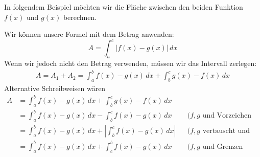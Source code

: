 \begin{bsp}
    In folgendem Beispiel möchten wir die Fläche zwischen den beiden Funktion $f(x)$ und $g(x)$ berechnen.
    \begin{center}
    \end{center}
    Wir können unsere Formel mit dem Betrag anwenden:
    \begin{equation*}
        A = \int_a^c \left| f(x)-g(x) \right| \, dx
    \end{equation*}
    Wenn wir jedoch nicht den Betrag verwenden, müssen wir das Intervall zerlegen:
    \begin{align*}
        A = A_1 + A_2 = \int_a^b f(x) - g(x) \, dx + \int_b^c g(x) - f(x) \, dx
    \end{align*}
    Alternative Schreibweisen wären
    \begin{align*}
        A &= \int_a^b f(x) - g(x) \, dx + \int_b^c g(x) - f(x) \, dx \\
        &= \int_a^b f(x) - g(x) \, dx - \int_b^c f(x)-g(x) \, dx  && \text{($f,g$ und Vorzeichen vertauscht)}\\
        &= \int_a^b f(x) - g(x) \, dx + \left|\int_b^c f(x)-g(x) \, dx \right| && \text{($f,g$ vertauscht und Betrag)}\\
        &= \int_a^b f(x) - g(x) \, dx + \int_c^b f(x)-g(x) \, dx && \text{($f,g$ und Grenzen vertauscht)}
    \end{align*}
\end{bsp}
